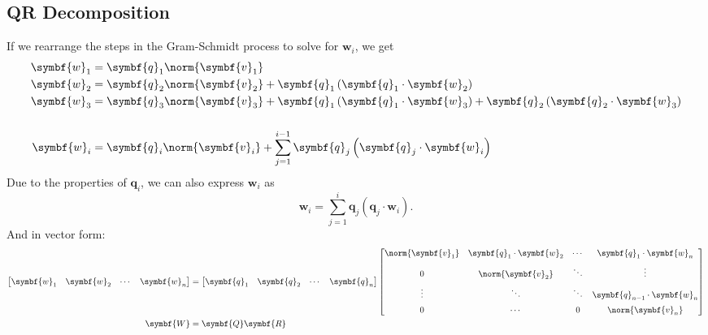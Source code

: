 \documentclass{article}
\begin{document}
\subsection{QR Decomposition}
If we rearrange the steps in the Gram-Schmidt process to solve for
\(\symbf{w}_i\), we get
\begin{align*}
    \symbf{w}_1 & = \symbf{q}_1 \norm{\symbf{v}_1}                                                                                                                       \\
    \symbf{w}_2 & = \symbf{q}_2 \norm{\symbf{v}_2} + \symbf{q}_1 \left( \symbf{q}_1 \cdot \symbf{w}_2 \right)                                                            \\
    \symbf{w}_3 & = \symbf{q}_3 \norm{\symbf{v}_3} + \symbf{q}_1 \left( \symbf{q}_1 \cdot \symbf{w}_3 \right) + \symbf{q}_2 \left( \symbf{q}_2 \cdot \symbf{w}_3 \right) \\
                &                                                                                                                                                        \\
    \symbf{w}_i & = \symbf{q}_i \norm{\symbf{v}_i} + \sum_{j = 1}^{i - 1} \symbf{q}_j \left( \symbf{q}_j \cdot \symbf{w}_i \right)
\end{align*}
Due to the properties of \(\symbf{q}_i\), we can also express \(\symbf{w}_i\) as
\begin{equation*}
    \symbf{w}_i = \sum_{j = 1}^{i} \symbf{q}_j \left( \symbf{q}_j \cdot \symbf{w}_i \right).
\end{equation*}
And in vector form:
\begin{align*}
    \begin{bmatrix}
        \symbf{w}_1 & \symbf{w}_2 & \cdots & \symbf{w}_n
    \end{bmatrix}
              & =
    \begin{bmatrix}
        \symbf{q}_1 & \symbf{q}_2 & \cdots & \symbf{q}_n
    \end{bmatrix}
    \begin{bmatrix}
        \norm{\symbf{v}_1} & \symbf{q}_1 \cdot \symbf{w}_2 & \cdots & \symbf{q}_1 \cdot \symbf{w}_n       \\[0.2cm]
        0                  & \norm{\symbf{v}_2}            & \ddots & \vdots                              \\[0.2cm]
        \vdots             & \ddots                        & \ddots & \symbf{q}_{n - 1} \cdot \symbf{w}_n \\[0.2cm]
        0                  & \cdots                        & 0      & \norm{\symbf{v}_n}
    \end{bmatrix}
    \\
    \symbf{W} & = \symbf{Q} \symbf{R}
\end{align*}
\end{document}
